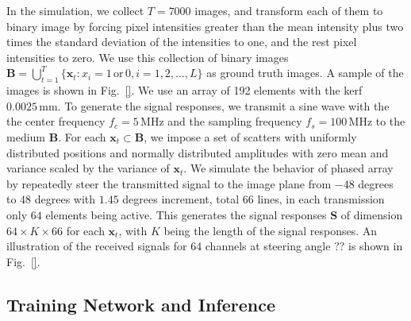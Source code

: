 \documentclass{article}
\begin{document}
In the simulation, we collect $T=7000$ images, and transform each of them to binary image by forcing pixel intensities greater than the mean intensity plus two times the standard deviation of the intensities to one, and the rest pixel intensities to zero. We use this collection of binary images $\mathbf{B}=\bigcup_{t=1}^{T}\{\mathbf{x}_t:x_i=1\,\mathrm{or}\,0, i=1,2,\ldots,L\}$ as ground truth images. A sample of the images is shown in Fig.~\ref{}. We use an array of 192 elements with the kerf\cite{} $0.0025\,\mathrm{mm}$. To generate the signal responses, we transmit a sine wave with the the center frequency $f_c=5\,\mathrm{MHz}$ and the sampling frequency $f_s=100\,\mathrm{MHz}$ to the medium $\mathbf{B}$. For each $\mathbf{x}_t\subset\mathbf{B}$, we impose a set of scatters with uniformly distributed positions and normally distributed amplitudes with zero mean and variance scaled by the variance of $\mathbf{x}_t$. We simulate the behavior of phased array by repeatedly steer the transmitted signal to the image plane from $-48$ degrees to $48$ degrees with $1.45$ degrees increment, total $66$ lines, in each transmission only $64$ elements being active. This generates the signal responses $\mathbf{S}$ of dimension $64 \times K \times 66$ for each $\mathbf{x}_t$, with $K$ being the length of the signal responses. An illustration of the received signals for 64 channels at steering angle $??$ is shown in Fig.~\ref{}.

\subsection{Training Network and Inference}
\label{sub:training_inference}
\end{document}
